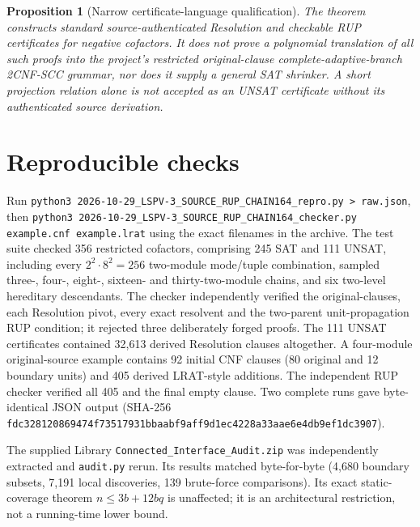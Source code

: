 \documentclass[11pt]{article}
\newtheorem{proposition}[theorem]{Proposition}
\begin{document}
\begin{proposition}[Narrow certificate-language qualification]
The theorem constructs standard source-authenticated Resolution and checkable RUP certificates for negative \emph{cofactors}. It does not prove a polynomial translation of all such proofs into the project's restricted original-clause complete-adaptive-branch 2CNF-SCC grammar, nor does it supply a general SAT shrinker. A short projection relation alone is not accepted as an UNSAT certificate without its authenticated source derivation.
\end{proposition}

\section{Reproducible checks}
Run \texttt{python3 2026-10-29\_LSPV-3\_SOURCE\_RUP\_CHAIN164\_repro.py > raw.json}, then \texttt{python3 2026-10-29\_LSPV-3\_SOURCE\_RUP\_CHAIN164\_checker.py example.cnf example.lrat} using the exact filenames in the archive. The test suite checked 356 restricted cofactors, comprising 245 SAT and 111 UNSAT, including every $2^2\cdot8^2=256$ two-module mode/tuple combination, sampled three-, four-, eight-, sixteen- and thirty-two-module chains, and six two-level hereditary descendants. The checker independently verified the original-clauses, each Resolution pivot, every exact resolvent and the two-parent unit-propagation RUP condition; it rejected three deliberately forged proofs. The 111 UNSAT certificates contained 32,613 derived Resolution clauses altogether. A four-module original-source example contains 92 initial CNF clauses (80 original and 12 boundary units) and 405 derived LRAT-style additions. The independent RUP checker verified all 405 and the final empty clause. Two complete runs gave byte-identical JSON output (SHA-256 \texttt{fdc328120869474f73517931bbaabf9aff9d1ec4228a33aae6e4db9ef1dc3907}).

The supplied Library \texttt{Connected\_Interface\_Audit.zip} was independently extracted and \texttt{audit.py} rerun. Its results matched byte-for-byte (4,680 boundary subsets, 7,191 local discoveries, 139 brute-force comparisons). Its exact static-coverage theorem $n\le3b+12bq$ is unaffected; it is an architectural restriction, not a running-time lower bound.
\end{document}

